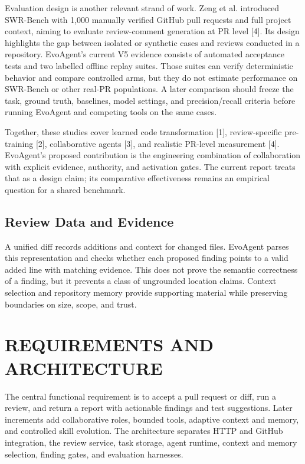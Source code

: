 \documentclass[journal,compsoc]{IEEEtran}
\begin{document}
Evaluation design is another relevant strand of work. Zeng et al. introduced SWR-Bench with 1,000 manually verified GitHub pull requests and full project context, aiming to evaluate review-comment generation at PR level [4]. Its design highlights the gap between isolated or synthetic cases and reviews conducted in a repository. EvoAgent’s current V5 evidence consists of automated acceptance tests and two labelled offline replay suites. Those suites can verify deterministic behavior and compare controlled arms, but they do not estimate performance on SWR-Bench or other real-PR populations. A later comparison should freeze the task, ground truth, baselines, model settings, and precision/recall criteria before running EvoAgent and competing tools on the same cases.

Together, these studies cover learned code transformation [1], review-specific pre-training [2], collaborative agents [3], and realistic PR-level measurement [4]. EvoAgent’s proposed contribution is the engineering combination of collaboration with explicit evidence, authority, and activation gates. The current report treats that as a design claim; its comparative effectiveness remains an empirical question for a shared benchmark.

\subsection{Review Data and Evidence}
A unified diff records additions and context for changed files. EvoAgent parses this representation and checks whether each proposed finding points to a valid added line with matching evidence. This does not prove the semantic correctness of a finding, but it prevents a class of ungrounded location claims. Context selection and repository memory provide supporting material while preserving boundaries on size, scope, and trust.

\section{REQUIREMENTS AND ARCHITECTURE}
The central functional requirement is to accept a pull request or diff, run a review, and return a report with actionable findings and test suggestions. Later increments add collaborative roles, bounded tools, adaptive context and memory, and controlled skill evolution. The architecture separates HTTP and GitHub integration, the review service, task storage, agent runtime, context and memory selection, finding gates, and evaluation harnesses.
\end{document}
